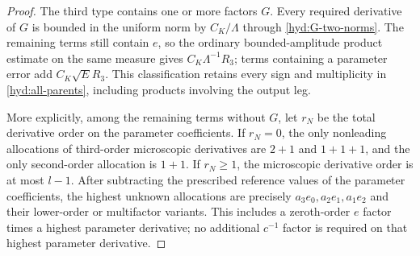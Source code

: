 \begin{proof}
 The third type contains one or more factors $G$. Every required
 derivative of $G$ is bounded in the uniform norm by $C_K/\Lambda$
 through \eqref{hyd:G-two-norms}. The remaining terms still contain $e$,
 so the ordinary bounded-amplitude product estimate on the same measure
 gives $C_K\Lambda^{-1}R_3$; terms containing a parameter error add
 $C_K\sqrt E R_3$. This classification retains every sign and
 multiplicity in \eqref{hyd:all-parents}, including products involving
 the output leg.

 More explicitly, among the remaining terms without $G$, let $r_N$ be
 the total derivative order on the parameter coefficients. If $r_N=0$,
 the only nonleading allocations of third-order microscopic derivatives
 are $2+1$ and $1+1+1$, and the only second-order allocation is $1+1$.
 If $r_N\ge1$, the microscopic derivative order is at most $l-1$.
 After subtracting the prescribed reference values of the parameter
 coefficients, the highest unknown allocations are precisely
 $a_3e_0,a_2e_1,a_1e_2$ and their lower-order or multifactor variants.
 This includes a zeroth-order $e$ factor times a highest parameter
 derivative; no additional $c^{-1}$ factor is required on that
 highest parameter derivative.


\end{proof}
